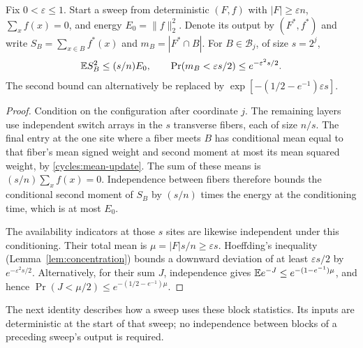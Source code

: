 \begin{lemma}\label{sweeps:block-statistics}
Fix $0<\varepsilon\le1$. Start a sweep from deterministic $(F,f)$
with $|F|\ge\varepsilon n$, $\sum_xf(x)=0$, and energy
$E_0=\|f\|_2^2$. Denote its output by $(F^*,f^*)$ and write
$S_B=\sum_{x\in B}f^*(x)$ and $m_B=|F^*\cap B|$. For
$B\in\mathcal B_j$, of size $s=2^j$,
\begin{equation}\label{sweeps:block-variance}
 \mathbb E S_B^2\le(s/n)E_0,\qquad
 \Pr(m_B<\varepsilon s/2)\le e^{-\varepsilon^2s/2}.
\end{equation}
The second bound can alternatively be replaced by
$\exp[-(1/2-e^{-1})\varepsilon s]$.
\end{lemma}
\begin{proof}
Condition on the configuration after coordinate $j$. The remaining
layers use independent switch arrays in the $s$ transverse fibers,
each of size $n/s$. The final entry at the one site where a fiber
meets $B$ has conditional mean equal to that fiber's mean signed
weight and second moment at most its mean squared weight, by
\eqref{cycles:mean-update}. The sum of these means is
$(s/n)\sum_x f(x)=0$. Independence between fibers therefore bounds
the conditional second moment of $S_B$ by $(s/n)$ times the energy
at the conditioning time, which is at most $E_0$.

The availability indicators at those $s$ sites are likewise independent
under this conditioning. Their total mean is
$\mu=|F|s/n\ge\varepsilon s$. Hoeffding's inequality
(Lemma~\ref{lem:concentration}) bounds a downward deviation of at least
$\varepsilon s/2$ by $e^{-\varepsilon^2s/2}$. Alternatively, for their
sum $J$, independence gives
$\mathbb E e^{-J}\le e^{-(1-e^{-1})\mu}$, and hence
$\Pr(J<\mu/2)\le e^{-(1/2-e^{-1})\mu}$.
\end{proof}

The next identity describes how a sweep uses these block statistics.
Its inputs are deterministic at the start of that sweep; no independence
between blocks of a preceding sweep's output is required.

